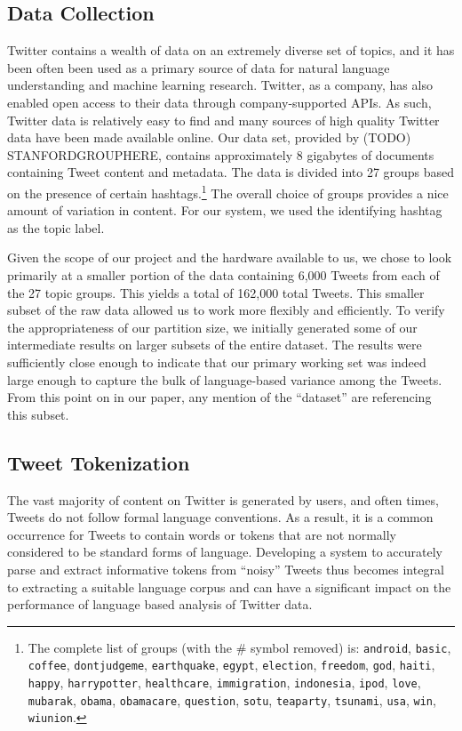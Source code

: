 \documentclass[11pt]{article}
\begin{document}
\subsection{Data Collection}
Twitter contains a wealth of data on an extremely diverse set of topics, and it has been often been used as a primary source of data for natural language understanding and machine learning research. Twitter, as a company, has also enabled open access to their data through company-supported APIs. As such, Twitter data is relatively easy to find and many sources of high quality Twitter data have been made available online. Our data set, provided by (TODO) STANFORDGROUPHERE, contains approximately 8 gigabytes of documents containing Tweet content and metadata. The data is divided into 27 groups based on the presence of certain hashtags.\footnote{The complete list of groups (with the \# symbol removed) is: \texttt{android}, \texttt{basic}, \texttt{coffee}, \texttt{dontjudgeme}, \texttt{earthquake}, \texttt{egypt}, \texttt{election}, \texttt{freedom}, \texttt{god}, \texttt{haiti}, \texttt{happy}, \texttt{harrypotter}, \texttt{healthcare}, \texttt{immigration}, \texttt{indonesia}, \texttt{ipod}, \texttt{love}, \texttt{mubarak}, \texttt{obama}, \texttt{obamacare}, \texttt{question}, \texttt{sotu}, \texttt{teaparty}, \texttt{tsunami}, \texttt{usa}, \texttt{win}, \texttt{wiunion}.} The overall choice of groups provides a nice amount of variation in content. For our system, we used the identifying hashtag as the topic label.

Given the scope of our project and the hardware available to us, we chose to look primarily at a smaller portion of the data containing 6,000 Tweets from each of the 27 topic groups. This yields a total of 162,000 total Tweets. This smaller subset of the raw data allowed us to work more flexibly and efficiently. To verify the appropriateness of our partition size, we initially generated some of our intermediate results on larger subsets of the entire dataset. The results were sufficiently close enough to indicate that our primary working set was indeed large enough to capture the bulk of language-based variance among the Tweets. From this point on in our paper, any mention of the ``dataset'' are referencing this subset.

\subsection{Tweet Tokenization}
The vast majority of content on Twitter is generated by users, and often times, Tweets do not follow formal language conventions. As a result, it is a common occurrence for Tweets to contain words or tokens that are not normally considered to be standard forms of language. Developing a system to accurately parse and extract informative tokens from ``noisy'' Tweets thus becomes integral to extracting a suitable language corpus and can have a significant impact on the performance of language based analysis of Twitter data.
\end{document}
